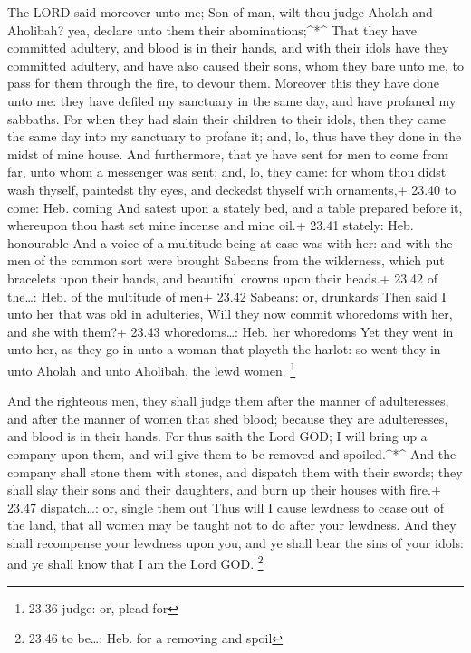  The LORD said moreover unto me; Son of man, wilt thou
judge Aholah and Aholibah? yea, declare unto them their
abominations;\^{}*\^{}  That they have committed adultery,
and blood is in their hands, and with their idols have they committed
adultery, and have also caused their sons, whom they bare unto me, to
pass for them through the fire, to devour them.  Moreover
this they have done unto me: they have defiled my sanctuary in the same
day, and have profaned my sabbaths.  For when they had
slain their children to their idols, then they came the same day into my
sanctuary to profane it; and, lo, thus have they done in the midst of
mine house.  And furthermore, that ye have sent for men to
come from far, unto whom a messenger was sent; and, lo, they came: for
whom thou didst wash thyself, paintedst thy eyes, and deckedst thyself
with ornaments,+ 23.40 to come: Heb. coming  And satest
upon a stately bed, and a table prepared before it, whereupon thou hast
set mine incense and mine oil.+ 23.41 stately: Heb. honourable
 And a voice of a multitude being at ease was with her: and
with the men of the common sort were brought Sabeans from the
wilderness, which put bracelets upon their hands, and beautiful crowns
upon their heads.+ 23.42 of the\ldots: Heb. of the multitude of men+
23.42 Sabeans: or, drunkards  Then said I unto her that was
old in adulteries, Will they now commit whoredoms with her, and she with
them?+ 23.43 whoredoms\ldots: Heb. her whoredoms  Yet they
went in unto her, as they go in unto a woman that playeth the harlot: so
went they in unto Aholah and unto Aholibah, the lewd women. \footnote{23.36
  judge: or, plead for}

 And the righteous men, they shall judge them after the
manner of adulteresses, and after the manner of women that shed blood;
because they are adulteresses, and blood is in their hands.
 For thus saith the Lord GOD; I will bring up a company
upon them, and will give them to be removed and spoiled.\^{}*\^{}
 And the company shall stone them with stones, and dispatch
them with their swords; they shall slay their sons and their daughters,
and burn up their houses with fire.+ 23.47 dispatch\ldots: or, single
them out  Thus will I cause lewdness to cease out of the
land, that all women may be taught not to do after your lewdness.
 And they shall recompense your lewdness upon you, and ye
shall bear the sins of your idols: and ye shall know that I am the Lord
GOD. \footnote{23.46 to be\ldots: Heb. for a removing and spoil}

